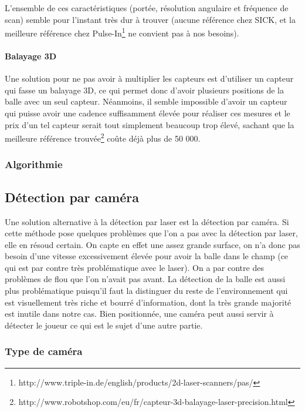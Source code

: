 L'ensemble de ces caractéristiques (portée, résolution angulaire et fréquence de scan) semble pour l'instant très dur à trouver (aucune référence chez SICK, et la meilleure référence chez Pulse-In\footnote{http://www.triple-in.de/english/products/2d-laser-scanners/pas/} ne convient pas à nos besoins). 


\paragraph{Balayage 3D\\}

Une solution pour ne pas avoir à multiplier les capteurs est d'utiliser un capteur qui fasse un balayage 3D, ce qui permet donc d'avoir plusieurs positions de la balle avec un seul capteur. Néanmoins, il semble impossible d'avoir un capteur qui puisse avoir une cadence suffisamment élevée pour réaliser ces mesures et le prix d'un tel capteur serait tout simplement beaucoup trop élevé, sachant que la meilleure référence trouvée\footnote{http://www.robotshop.com/eu/fr/capteur-3d-balayage-laser-precision.html} coûte déjà plus de 50 000\texteuro. 

\subsubsection{Algorithmie}


\subsection{Détection par caméra}

Une solution alternative à la détection par laser est la détection par caméra. Si cette méthode pose quelques problèmes que l'on a pas avec la détection par laser, elle en résoud certain. On capte en effet une assez grande surface, on n'a donc pas besoin d'une vitesse excessivement élevée pour avoir la balle dans le champ (ce qui est par contre très problématique avec le laser). On a par contre des problèmes de flou que l'on n'avait pas avant. La détection de la balle est aussi plus problématique puisqu'il faut la distinguer du reste de l'environnement qui est visuellement très riche et bourré d'information, dont la très grande majorité est inutile dans notre cas. Bien positionnée, une caméra peut aussi servir à détecter le joueur ce qui est le sujet d'une autre partie.


\subsubsection{Type de caméra}



